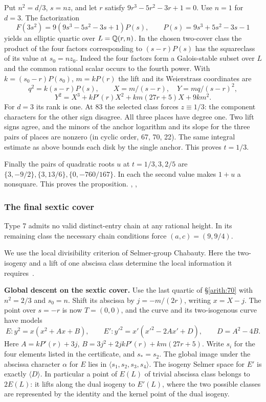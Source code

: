 Put \(n^2=d/3\), \(s=nz\), and let \(r\) satisfy
\(9r^3-5r^2-3r+1=0\). Use \(n=1\) for \(d=3\). The factorization
\[F(3s^2)=9(9s^3-5s^2-3s+1)P(s),\qquad P(s)=9s^3+5s^2-3s-1\]
yields an elliptic quartic over \(L=\mathbb Q(r,n)\). In the chosen
two-cover class the product of the four factors corresponding to
\((s-r)P(s)\) has the squareclass of its value at \(s_0=nz_0\).
Indeed the four factors form a Galois-stable subset over \(L\) and
the common rational scalar occurs to the fourth power. With
\(k=(s_0-r)P(s_0)\), \(m=kP(r)\) the lift and its Weierstrass
coordinates are
\[q^2=k(s-r)P(s),\qquad X=m/(s-r),\quad Y=mq/(s-r)^2,\]
\[Y^2=X^3+kP'(r)X^2+km(27r+5)X+9km^2 .\]
For \(d=3\) its rank is one. At 83 the selected class forces
\(z\equiv1/3\): the component characters for the other sign disagree.
All three places have degree one. Two lift signs agree, and the minors
of the anchor logarithm and its slope for the three pairs of places
are nonzero (in cyclic order, 67, 70, 22). The same integral estimate
as above bounds each disk by the single anchor. This proves \(t=1/3\).

Finally the pairs of quadratic roots \(u\) at \(t=1/3,3,2/5\)
are \(\{3,-9/2\},\{3,13/6\},\{0,-760/167\}\). In each the second
value makes \(1+u\) a nonsquare. This proves the proposition.
,
,

\subsubsection{The final sextic cover}\label{arith:71}

Type 7 admits no valid distinct-entry chain at any
rational height. In its remaining class the necessary chain conditions
force \((a,c)=(9,9/4)\).

We use the local divisibility criterion of Selmer-group Chabauty.
Here the two-isogeny and a lift of one abscissa class determine the
local information it requires~\cite{StollMW}.

\textbf{Global descent on the sextic cover.} Use the last quartic of \S\ref{arith:70}
with \(n^2=2/3\) and \(s_0=n\). Shift its abscissa by
\(j=-m/(2r)\), writing \(x=X-j\). The point over \(s=-r\) is now
\(T=(0,0)\), and the curve and its two-isogenous curve have models
\[E:y^2=x(x^2+A x+B),\qquad E':y'^2=x'(x'^2-2A x'+D),
 \qquad D=A^2-4B .\]
Here \(A=kP'(r)+3j\), \(B=3j^2+2jkP'(r)+km(27r+5)\).
Write \(s_i\) for the four elements listed in the certificate, and
\(s_* = s_2\). The global image under the abscissa character
\(\alpha\) for \(E\) lies in \(\langle s_1,s_2,s_3,s_4\rangle\).
The isogeny Selmer space for \(E'\) is exactly \(\langle D\rangle\).
In particular a point of \(E(L)\) of trivial abscissa class belongs to
\(2E(L)\): it lifts along the dual isogeny to \(E'(L)\), where the
two possible classes are represented by the identity and the kernel
point of the dual isogeny.

